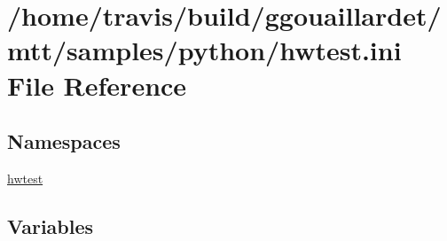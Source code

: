 \hypertarget{hwtest_8ini}{\section{/home/travis/build/ggouaillardet/mtt/samples/python/hwtest.ini File Reference}
\label{hwtest_8ini}
}
\subsection*{Namespaces}
\begin{DoxyCompactItemize}
\item 
\hyperlink{namespacehwtest}{hwtest}
\end{DoxyCompactItemize}
\subsection*{Variables}
